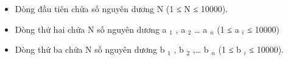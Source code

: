 \begin{itemize}
	\item     Dòng đầu tiên chứa số nguyên dương N (1 ≤ N ≤ 10000).   
	\item     Dòng thứ hai chứa N số nguyên dương a    $_     1    $    , a    $_     2    $    … a    $_     n    $    (1 ≤ a    $_     i    $    ≤ 10000)   
	\item     Dòng thứ ba chứa N số nguyên dương b    $_     1    $    , b    $_     2    $    ,… b    $_     n    $    (1 ≤ b    $_     i    $    ≤ 10000).   
\end{itemize}